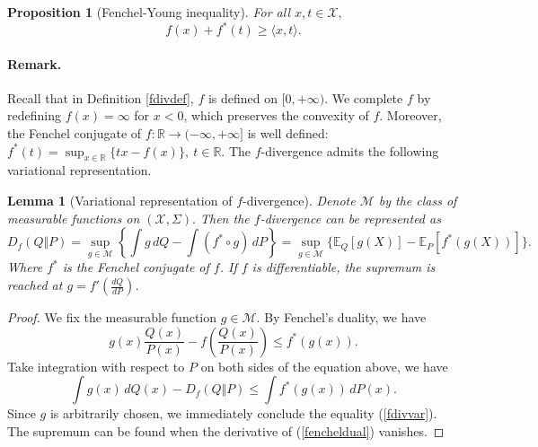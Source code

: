 \documentclass{article}
\numberwithin{equation}{section}
\newcommand{\E}{\mathbb{E}}
\theoremstyle{plain}
\newtheorem{lemma}[theorem]{Lemma}
\newtheorem{proposition}[theorem]{Proposition}
\theoremstyle{definition}
\begin{document}
\begin{proposition}[Fenchel-Young inequality]
For all $x,t\in\mathcal{X},$
\begin{equation*}
	f(x) + f^*(t)\geq \langle x,t\rangle.
\end{equation*}
\end{proposition} 

\paragraph{Remark.} Recall that in Definition \ref{fdivdef}, $f$ is defined on $[0,+\infty)$. We complete $f$ by redefining $f(x)=\infty$ for $x<0$, which preserves the convexity of $f$. Moreover, the Fenchel conjugate of $f:\mathbb{R}\to(-\infty,+\infty]$ is well defined: $f^*(t) = \sup_{x\in\mathbb{R}}\{tx - f(x)\},\ t\in\mathbb{R}$. The $f$-divergence admits the following variational representation.

\begin{lemma}[Variational representation of $f$-divergence]
Denote $\mathcal{M}$ by the class of measurable functions on $(\mathcal{X},\Sigma).$ Then the $f$-divergence can be represented as
\begin{equation}
	D_f(Q\Vert P) = \sup_{g\in\mathcal{M}} \left\{\int g\,dQ - \int (f^*\circ g)\,dP \right\}=\sup_{g\in\mathcal{M}} \bigl\{\E_Q[g(X)] - \E_P[f^*(g(X))]\bigr\}.\label{fdivvar}
\end{equation}
Where $f^*$ is the Fenchel conjugate of $f$. If $f$ is differentiable, the supremum is reached at $g = f'(\frac{dQ}{dP})$.
\end{lemma} 
\begin{proof}
We fix the measurable function $g\in\mathcal{M}.$ By Fenchel's duality, we have
\begin{equation*}
	g(x)\frac{Q(x)}{P(x)} - f\left(\frac{Q(x)}{P(x)}\right)\leq f^*(g(x)).
\end{equation*}
Take integration with respect to $P$ on both sides of the equation above, we have
\begin{equation*}
	\int g(x)\,dQ(x) - D_f(Q\Vert P) \leq \int f^*(g(x))\,dP(x).
\end{equation*}
Since $g$ is arbitrarily chosen, we immediately conclude the equality (\ref{fdivvar}). The supremum can be found when the derivative of (\ref{fencheldual}) vanishes.
\end{proof}
\end{document}
